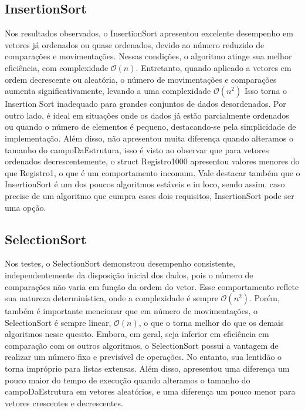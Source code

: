 \documentclass[a4paper, 12pt]{article}
\begin{document}
\subsection{InsertionSort}
 Nos resultados observados, o InsertionSort apresentou excelente desempenho em vetores já ordenados ou quase ordenados, devido ao número reduzido de comparações e movimentações. Nessas condições, o algoritmo atinge sua melhor eficiência, com complexidade \( \mathcal{O}(n) \). Entretanto, quando aplicado a vetores em ordem decrescente ou aleatória, o número de movimentações e comparações aumenta significativamente, levando a uma complexidade \( \mathcal{O}(n^2) \) Isso torna o Insertion Sort inadequado para grandes conjuntos de dados desordenados. Por outro lado, é ideal em situações onde os dados já estão parcialmente ordenados ou quando o número de elementos é pequeno, destacando-se pela simplicidade de implementação. Além disso, não apresentou muita diferença quando alteramos o tamanho do campoDaEstrutura, isso é visto ao observar que para vetores ordenados decrescentemente, o struct Registro1000 apresentou valores menores do que Registro1, o que é um comportamento incomum. Vale destacar também que o InsertionSort é um dos poucos algoritmos estáveis e in loco, sendo assim, caso precise de um algoritmo que cumpra esses dois requisitos, InsertionSort pode ser uma opção.
 
 \subsection{SelectionSort}
 Nos testes, o SelectionSort demonstrou desempenho consistente, independentemente da disposição inicial dos dados, pois o número de comparações não varia em função da ordem do vetor. Esse comportamento reflete sua natureza determinística, onde a complexidade é sempre \( \mathcal{O}(n^2) \). Porém, também é importante mencionar que em número de movimentações, o SelectionSort é sempre linear, \( \mathcal{O}(n) \), o que o torna melhor do que os demais algoritmos nesse quesito. Embora, em geral, seja inferior em eficiência em comparação com os outros algoritmos, o SelectionSort possui a vantagem de realizar um número fixo e previsível de operações. No entanto, sua lentidão o torna impróprio para listas extensas. Além disso, apresentou uma diferença um pouco maior do tempo de execução quando alteramos o tamanho do campoDaEstrutura em vetores aleatórios, e uma diferença um pouco menor para vetores crescentes e decrescentes.
\end{document}
